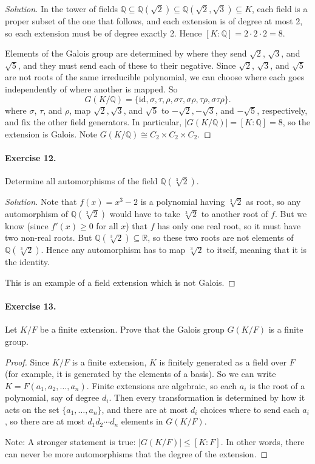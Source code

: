 \documentclass{article}
\newcommand{\Q}{\mathbb Q}
\newcommand{\Gal}{G}
\begin{document}
\begin{proof}[Solution]
In the tower of fields $\Q\subseteq \Q(\sqrt 2)\subseteq \Q(\sqrt
2,\sqrt 3)\subseteq K$, each field is a proper subset of the one that
follows, and each extension is of degree at most 2, so each extension
must be of degree exactly 2. Hence $[K:\Q]=2\cdot 2\cdot 2=8.$

Elements of the Galois group are determined by where they send $\sqrt
2$, $\sqrt 3$, and $\sqrt 5$, and they must send each of these to
their negative. Since $\sqrt2$, $\sqrt3$, and $\sqrt 5$ are not roots
of the same irreducible polynomial, we can choose where each goes
independently of where another is mapped.  So
$$\Gal(K/\Q) = \{\text{id}, \sigma, \tau, \rho, \sigma\tau, \sigma\rho, \tau\rho, \sigma\tau\rho\}.$$
where $\sigma$, $\tau$, and $\rho$, map $\sqrt 2,\sqrt 3$, and $\sqrt 5$ to
$-\sqrt 2, -\sqrt 3$, and $-\sqrt 5$, respectively, and fix the other field
generators. In particular, $|\Gal(K/\Q)|=[K:\Q]=8$, so the extension
is Galois. Note $\Gal(K/\Q)\cong C_2\times C_2\times C_2$.
\end{proof}

\paragraph{Exercise 12.} Determine all automorphisms of the field
$\Q(\sqrt[3] 2)$.

\begin{proof}[Solution]
Note that $f(x)=x^3-2$ is a polynomial having $\sqrt[3]2$ as root, so any
automorphism of $\Q(\sqrt[3] 2)$ would have to take $\sqrt[3]2$ to
another root of $f$. But we know (since $f'(x)\geq 0$ for all $x$)
that $f$ has only one real root, so it must have two non-real
roots. But $\Q(\sqrt[3]2)\subseteq \mathbb R$, so these two roots are
not elements of $\Q(\sqrt[3]2)$. Hence any automorphism has to map
$\sqrt[3]2$ to itself, meaning that it is the identity.

This is an example of a field extension which is not Galois.
\end{proof}

\paragraph{Exercise 13.} Let $K/F$ be a finite extension. Prove that
the Galois group $G(K/F)$ is a finite group.
\begin{proof}
Since $K/F$ is a finite extension, $K$ is finitely generated as a field over $F$ (for example, it is generated by the elements of a basis).
So we can write $K=F(a_1,a_2,\ldots,a_n)$. Finite extensions are algebraic, so each $a_i$ is the root of a polynomial, say
of degree $d_i$. Then every transformation is determined by how it
acts on the set $\{a_1,\ldots,a_n\}$, and there are at most $d_i$
choices where to send each $a_i$, so there are at most $d_1d_2\cdots
d_n$ elements in $G(K/F)$.

Note: A stronger statement is true: $|G(K/F)|\leq [K:F]$. In other
words, there can never be more automorphisms that the degree of the
extension.
\end{proof}
\end{document}
